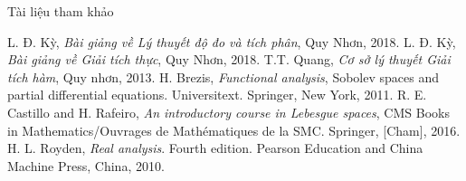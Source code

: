 \documentclass[notheorems,envcountsect,hyperref=unicode]{beamer}
\newcommand{\R}{\mathbb R}
\newcommand{\N}{\mathbb N}
\def\A{\mathcal{A}}
\def\R{\mathbb{R}}
\def\N{\mathbb{N}}
\def\Lpp{\mathit{L_p}}
\def\m{\mu}
\def\disint{\displaystyle\int}
\def\hkn{hầu khắp nơi}
\def\kgdd{(X,\A,\mu)}
\begin{document}
%
%

\begin{frame}{Tài liệu tham khảo}
\begin{thebibliography}{99}
	 L. Đ. Kỳ, \textit{Bài giảng về Lý thuyết độ đo và tích phân}, Quy Nhơn, 2018.
	 L. Đ. Kỳ, \textit{Bài giảng về Giải tích thực}, Quy Nhơn, 2018.
	 T.T. Quang, \textit{Cơ sở lý thuyết Giải tích hàm}, Quy nhơn, 2013.
	 H. Brezis, \textit{Functional analysis}, Sobolev spaces and partial differential equations. Universitext. Springer, New York, 2011.
	 R. E. Castillo and H. Rafeiro, \textit{An introductory course in Lebesgue spaces}, CMS Books in Mathematics/Ouvrages de Mathématiques de la SMC. Springer, [Cham], 2016.
	 H. L. Royden, \textit{Real analysis}. Fourth edition. Pearson Education and China Machine Press, China, 2010.
\end{thebibliography}
\end{frame}
\begin{frame}
\centerline{\Large\bf \fontsize{18}{18}\selectfont{\color{red}{KẾT THÚC BÁO CÁO}}}
\vspace{1cm}
\centerline{\Large\bf \fontsize{23}{18}\selectfont{\color{blue}{TRÂN TRỌNG CẢM ƠN!}}}

\end{frame}
\end{document}
